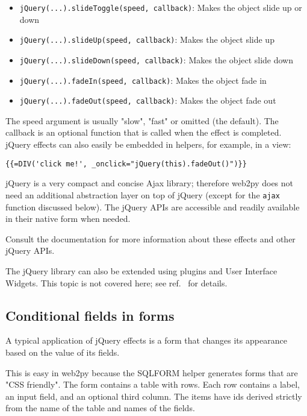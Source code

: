\documentclass[justified,sixbynine,notoc]{tufte-book}
\def\ft{\small\tt}
\begin{document}
\begin{fullwidth}
\begin{itemize}
\item {\ft jQuery(...).slideToggle(speed, callback)}: Makes the object slide up or down

\item {\ft jQuery(...).slideUp(speed, callback)}: Makes the object slide up

\item {\ft jQuery(...).slideDown(speed, callback)}: Makes the object slide down

\item {\ft jQuery(...).fadeIn(speed, callback)}: Makes the object fade in

\item {\ft jQuery(...).fadeOut(speed, callback)}: Makes the object fade out
\end{itemize}

The speed argument is usually "slow", "fast" or omitted (the default). The callback is an optional function that is called when the effect is completed.
\noindent jQuery effects can also easily be embedded in helpers, for example,
in a view:
\begin{lstlisting}[keywords={}]
{{=DIV('click me!', _onclick="jQuery(this).fadeOut()")}}
\end{lstlisting}
\noindent jQuery is a very compact and concise Ajax library; therefore web2py does not need an additional abstraction layer on top of jQuery (except for the {\ft ajax} function discussed below). The jQuery APIs are accessible and readily available in their native form when needed.

Consult the documentation for more information about these effects and other jQuery APIs.

The jQuery library can also be extended using plugins and User Interface Widgets. This topic is not covered here; see ref.~\cite{jquery-ui} for details.

\goodbreak\subsection{Conditional fields in forms}

A typical application of jQuery effects is a form that changes its appearance based on the value of its fields.

This is easy in web2py because the SQLFORM helper generates forms that are "CSS friendly". The form contains a table with rows. Each row contains a label, an input field, and an optional third column. The items have ids derived strictly from the name of the table and names of the fields.


\end{fullwidth}
\end{document}
